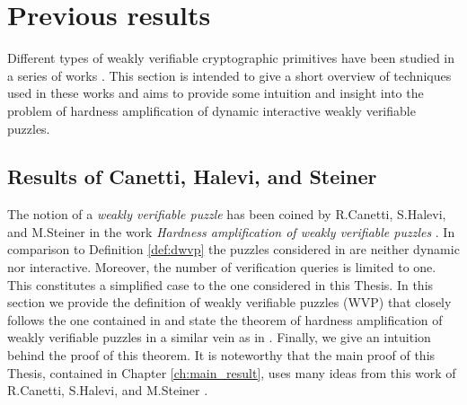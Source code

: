 \section{Previous results}
\label{st:previous_results}
Different types of weakly verifiable cryptographic primitives have been studied in a series of works
\cite{canetti2004hardness, Dodis:2009:SAI:1530441.1530450, DBLP:journals/corr/abs-1002-3534}.
This section is intended to give a short overview of techniques used in these works
and aims to provide some intuition and insight into the problem of hardness amplification
of dynamic interactive weakly verifiable puzzles.
\subsection{Results of Canetti, Halevi, and Steiner}
\label{subsec:chs}
The notion of a \textit{weakly verifiable puzzle} has been coined by R.Canetti, S.Halevi, and M.Steiner in the work
\textit{Hardness amplification of weakly verifiable puzzles} \cite{canetti2004hardness}.
In comparison to Definition \ref{def:dwvp} the puzzles considered in \cite{canetti2004hardness} are neither dynamic nor interactive.
Moreover, the number of verification queries is limited to one.
This constitutes a simplified case to the one considered in this Thesis.
In this section we provide the definition of weakly verifiable puzzles (WVP) that closely follows the one contained in \cite{canetti2004hardness}
and state the theorem of hardness amplification of weakly verifiable puzzles in a similar vein as in \cite{canetti2004hardness}.
Finally, we give an intuition behind the proof of this theorem.
It is noteworthy that the main proof of this Thesis, contained in Chapter \ref{ch:main_result},
uses many ideas from this work of R.Canetti, S.Halevi, and M.Steiner \cite{canetti2004hardness}.
%
